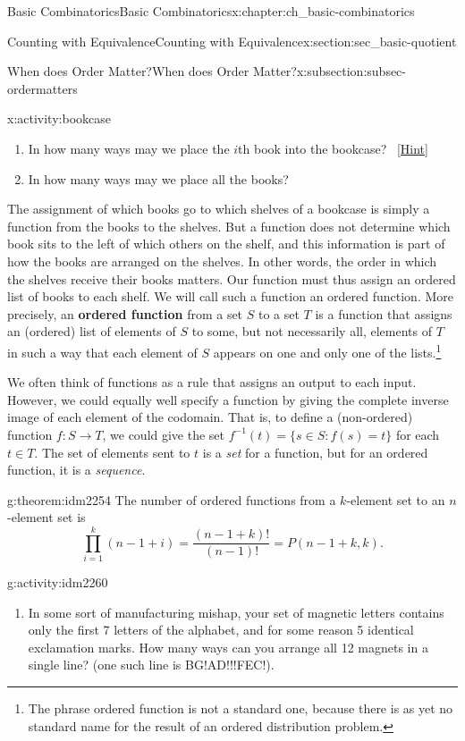 \documentclass[oneside,10pt,]{book}
\newcommand{\terminology}[1]{\textbf{#1}}
\numberwithin{equation}{chapter}
\def\inv{^{-1}}
\def\st{:}
\begin{document}
\begin{chapterptx}{Basic Combinatorics}{}{Basic Combinatorics}{}{}{x:chapter:ch_basic-combinatorics}
\begin{sectionptx}{Counting with Equivalence}{}{Counting with Equivalence}{}{}{x:section:sec_basic-quotient}
\begin{subsectionptx}{When does Order Matter?}{}{When does Order Matter?}{}{}{x:subsection:subsec-ordermatters}
\begin{activity}{}{x:activity:bookcase}
\begin{enumerate}[font=\bfseries,label=(\alph*),ref=\alph*]
\item{}In how many ways may we place the \(i\)th book into the bookcase?%
\qquad~\hfill{\tiny\hyperlink{g:hint:idm2218-back}{[Hint]}}\item{}In how many ways may we place all the books?%
\end{enumerate}
\end{activity}
The assignment of which books go to which shelves of a bookcase is simply a function from the books to the shelves. But a function does not determine which book sits to the left of which others on the shelf, and this information is part of how the books are arranged on the shelves. In other words, the order in which the shelves receive their books matters.  Our function must thus assign an ordered list of books to each shelf. We will call such a function an ordered function. More precisely, an \terminology{ordered function} from a set \(S\) to a set \(T\) is a function that assigns an (ordered) list of elements of \(S\) to some, but not necessarily all, elements of \(T\) in such a way that each element of \(S\) appears on one and only one of the lists.\footnote{The phrase ordered function is not a standard one, because there is as yet no standard name for the result of an ordered distribution problem.\label{g:fn:idm2246}}%
\par
We often think of functions as a rule that assigns an output to each input.  However, we could equally well specify a function by giving the complete inverse image of each element of the codomain.  That is, to define a (non-ordered) function \(f:S \to T\), we could give the set \(f\inv(t) = \{s \in S \st f(s) = t\}\) for each \(t \in T\).  The set of elements sent to \(t\) is a \emph{set} for a function, but for an ordered function, it is a \emph{sequence}.%
\begin{theorem}{}{}{g:theorem:idm2254}%
The number of ordered functions from a \(k\)-element set to an \(n\)-element set is%
\begin{equation*}
\prod_{i=1}^k (n-1+i) = \frac{(n-1+k)!}{(n-1)!} = P(n-1+k, k).
\end{equation*}
%
\end{theorem}
\begin{activity}{}{g:activity:idm2260}%
\begin{enumerate}[font=\bfseries,label=(\alph*),ref=\alph*]
\item{}In some sort of manufacturing mishap, your set of magnetic letters contains only the first 7 letters of the alphabet, and for some reason 5 identical exclamation marks.  How many ways can you arrange all 12 magnets in a single line?  (one such line is BG!AD!!!FEC!).%

\end{enumerate}
\end{activity}
\end{subsectionptx}
\end{sectionptx}
\end{chapterptx}
\end{document}
